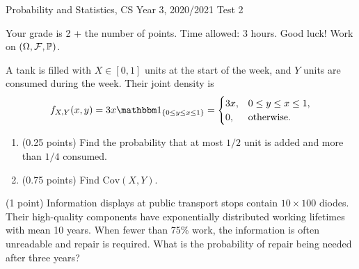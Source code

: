 \documentclass[a4paper]{report}
\newif\ifshowsolutions
\begin{document}
\noindent Probability and Statistics, CS Year 3, 2020/2021 \hfill Test 2\ifshowsolutions: solutions\fi
\hrulefill
\begin{it}Your grade is 2 + the number of points. Time allowed: 3 hours. Good luck! Work on $(\Omega,\mathcal F,\P)$.\end{it}
\begin{problem}
A tank is filled with $X\in[0,1]$ units at the start of the week, and $Y$ units are consumed during the week. Their joint density is
\[f_{X,Y}(x,y)=3x\mathbbm1_{\{0\leq y\leq x\leq1\}}=\begin{cases}3x,&0\leq y\leq x\leq1,\\0,&\text{otherwise.}\end{cases}\]
\begin{enumerate}
\item (0.25 points) Find the probability that at most $1/2$ unit is added and more than $1/4$ consumed.
\ifshowsolutions
\par\textbf{Solution.}
\[\P(X<1/2,Y>1/4)=\int_{1/4}^{1/2}\int_{1/4}^x3x\,dy\,dx=\int_{1/4}^{1/2}3x(x-1/4)\,dx=\frac5{128}.\]
\fi
\item (0.75 points) Find $\mathrm{Cov}(X,Y)$.
\ifshowsolutions
\par\textbf{Solution.} For $x\in[0,1]$, $f_X(x)=\int_0^x3x\,dy=3x^2$, so $\E X=\int_0^1x3x^2\,dx=3/4$. Similarly, for $y\in[0,1]$,
\[f_Y(y)=\int_y^13x\,dx=\frac32(1-y^2),\qquad\E Y=\frac32\int_0^1y(1-y^2)\,dy=\frac38.\]
Finally,
\[\E[XY]=\int_0^1\int_0^xxy3x\,dy\,dx=\int_0^1\frac32x^4\,dx=\frac3{10},\]
so $\mathrm{Cov}(X,Y)=\E[XY]-\E X\E Y=3/160$.
\fi
\end{enumerate}
\end{problem}
\begin{problem} (1 point)
Information displays at public transport stops contain $10\times100$ diodes. Their high-quality components have exponentially distributed working lifetimes with mean 10 years. When fewer than 75\% work, the information is often unreadable and repair is required. What is the probability of repair being needed after three years?
\ifshowsolutions
\par\textbf{Solution.} Each lifetime is $\mathrm{Exp}(1/10)$, and its survival probability is
\[\P(\mathrm{Exp}(1/10)>3)=\int_3^\infty\frac1{10}e^{-x/10}\,dx=[-e^{-x/10}]_3^\infty=e^{-3/10}=:p.\]
The indicators $X_i=\mathbbm1_{\{\text{diode }i\text{ works after three years}\}}$ are $\mathrm{Ber}(p)$, with mean $p$ and variance $p(1-p)$. The finite variance and relatively large $n=1000$ allow the CLT approximation
\begin{align*}
\P\left(\sum_{i=1}^nX_i<750\right)&=\P\left(\frac{\sum X_i-np}{\sqrt{np(1-p)}}<\frac{750-np}{\sqrt{np(1-p)}}\right)\\
&\approx\P(N(0,1)<0.66)=\Phi(0.66)\approx74.54\%.
\end{align*}
\fi
\end{problem}
\end{document}
